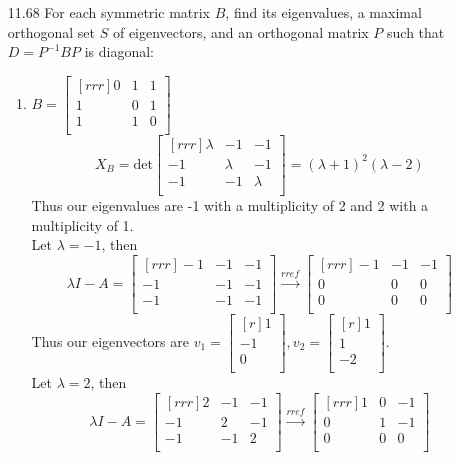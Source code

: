 \documentclass[12pt]{article}
\theoremstyle{definition}
\theoremstyle{plain}
\begin{document}
\begin{enumerate}
\item[11.68]For each symmetric matrix $B$, find its eigenvalues, a maximal orthogonal set $S$ of eigenvectors, and an orthogonal matrix $P$ such that $D=P^{-1}BP$ is diagonal:
	\begin{enumerate}
	\item $B=\begin{bmatrix}[rrr]0&1&1\\1&0&1\\1&1&0\\\end{bmatrix}$\\
	\[ X_B=\mathrm{det}\begin{bmatrix}[rrr]\lambda&-1&-1\\-1&\lambda&-1\\-1&-1&\lambda\\\end{bmatrix} = (\lambda+1)^2(\lambda-2) \]
	Thus our eigenvalues are -1 with a multiplicity of 2 and 2 with a multiplicity of 1.\\
	Let $\lambda=-1$, then
	\[ \lambda I-A=\begin{bmatrix}[rrr]-1&-1&-1\\-1&-1&-1\\-1&-1&-1\\\end{bmatrix}\xrightarrow[]{rref} \begin{bmatrix}[rrr]-1&-1&-1\\0&0&0\\0&0&0\\\end{bmatrix} \]
	Thus our eigenvectors are $v_1=\begin{bmatrix}[r]1\\-1\\0\\\end{bmatrix},v_2=\begin{bmatrix}[r]1\\1\\-2\\\end{bmatrix}$.\\
	Let $\lambda=2$, then
	\[ \lambda I-A = \begin{bmatrix}[rrr]2&-1&-1\\-1&2&-1\\-1&-1&2\\\end{bmatrix} \xrightarrow[]{rref}\begin{bmatrix}[rrr]1&0&-1\\0&1&-1\\0&0&0\\\end{bmatrix} \]

\end{enumerate}
\end{enumerate}
\end{document}
